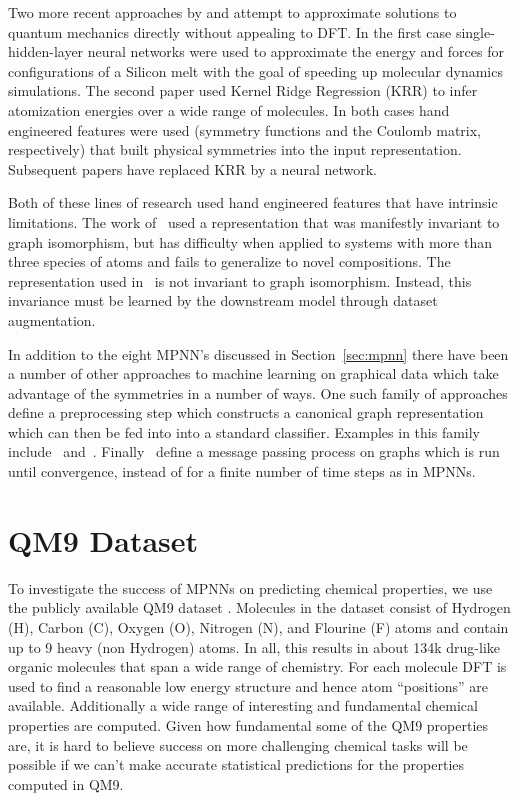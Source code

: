\documentclass{article}
\begin{document}
Two more recent approaches by \citet{behler2007} and \citet{coloumb} attempt to approximate solutions to quantum mechanics directly without appealing to DFT. In the first case single-hidden-layer neural networks were used to approximate the energy and forces for configurations of a Silicon melt with the goal of speeding up molecular dynamics simulations. The second paper used Kernel Ridge Regression (KRR) to infer atomization energies over a wide range of molecules. In both cases hand engineered features were used (symmetry functions and the Coulomb matrix, respectively) that built physical symmetries into the input representation. Subsequent papers have replaced KRR by a neural network.

Both of these lines of research used hand engineered features that have intrinsic limitations. The work of~\citet{behler2007} used a representation that was manifestly invariant to graph isomorphism, but has difficulty when applied to systems with more than three species of atoms and fails to generalize to novel compositions. The representation used in~\citet{coloumb} is not invariant to graph isomorphism. Instead, this invariance must be learned by the downstream model through dataset augmentation.


In addition to the eight MPNN’s discussed in Section~\ref{sec:mpnn} there have been a number of other approaches to machine learning on graphical data which take advantage of the symmetries in a number of ways. One such family of approaches define a preprocessing step which constructs a canonical graph representation which can then be fed into into a standard classifier. Examples in this family include~\citet{niepert2016learning} and~\citet{coloumb}. Finally~\citet{scarselli2009graph} define a message passing process on graphs which is run until convergence, instead of for a finite number of time steps as in MPNNs.







\section{QM9 Dataset} 

To investigate the success of MPNNs on predicting chemical properties, we use the publicly available QM9 dataset \citep{ramakrishnan2014}. Molecules in the dataset consist of Hydrogen (H), Carbon (C), Oxygen (O), Nitrogen (N), and Flourine (F) atoms and contain up to 9 heavy (non Hydrogen) atoms. In all, this results in about 134k drug-like organic molecules that span a wide range of chemistry. For each molecule DFT is used to find a reasonable low energy  structure and hence atom ``positions'' are available. Additionally a wide range of interesting and fundamental chemical properties are computed. Given how fundamental some of the QM9 properties are, it is hard to believe success on more challenging chemical tasks will be possible if we can't make accurate statistical predictions for the properties computed in QM9.
\end{document}
